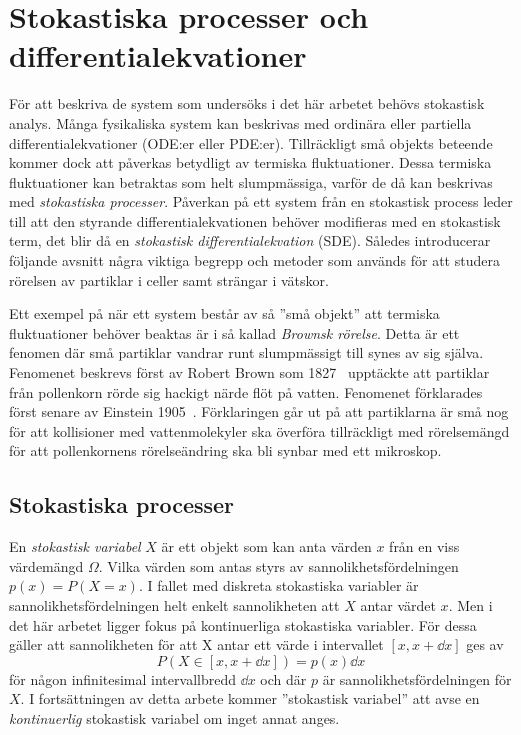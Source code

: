 \chapter{Stokastiska processer och differentialekvationer}

För att beskriva de system som undersöks i det här arbetet
behövs stokastisk analys. Många fysikaliska system kan beskrivas med ordinära eller partiella differential\-ekvationer (ODE:er
eller PDE:er). Tillräckligt små objekts beteende kommer dock att påverkas betydligt av termiska fluktuationer. Dessa termiska fluktuationer kan betraktas som helt
slumpmässiga, varför de då kan beskrivas med \emph{stokastiska processer}. Påverkan på ett system från en stokastisk process leder
till att den styrande differentialekvationen behöver modifieras med en stokastisk term,
det blir då en \emph{stokastisk differentialekvation} (SDE). 
Således introducerar följande avsnitt några viktiga begrepp och metoder 
som används för att studera rörelsen av partiklar i celler samt 
strängar i vätskor. 

Ett exempel på när ett system består av så ''små objekt'' att termiska
fluktuationer behöver beaktas är i så kallad \emph{Brownsk rörelse}. 
Detta är ett fenomen där små partiklar vandrar runt slumpmässigt till synes av sig själva. Fenomenet beskrevs först av Robert Brown som 1827~\cite{Brown1828} upptäckte att partiklar från pollenkorn rörde sig hackigt närde flöt på vatten. Fenomenet förklarades först senare av Einstein 1905~\cite{Einstein1905}. Förklaringen går ut på att partiklarna är små nog för att kollisioner med vattenmolekyler ska överföra tillräckligt med rörelsemängd för att pollenkornens rörelseändring ska bli synbar med ett mikroskop. 


\section{Stokastiska processer}
En \emph{stokastisk variabel} $X$ är ett objekt som kan anta värden
$x$ från en viss värdemängd $\Omega$. Vilka värden som antas styrs av
sannolikhetsfördelningen $p(x)=P(X=x)$. I fallet med diskreta stokastiska
variabler är sannolikhetsfördelningen helt enkelt sannolikheten att
$X$ antar värdet $x$. Men i det här arbetet ligger fokus på
kontinuerliga stokastiska variabler. För dessa gäller att sannolikheten för att X antar ett värde i intervallet $[x, x+\dd{x}]$ ges av
\begin{equation}
P(X\in[x, x+\dd{x}]) =p(x)\dd{x}
\end{equation}
för någon infinitesimal intervallbredd $\dd{x}$ och där $p$ är sannolikhetsfördelningen för $X$. 
I fortsättningen av detta arbete kommer ''stokastisk variabel'' att
avse en \emph{kontinuerlig} stokastisk variabel om inget annat anges.


